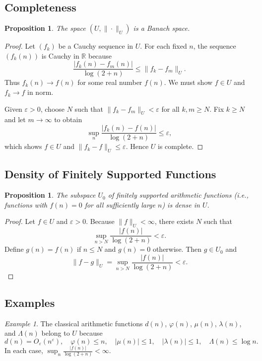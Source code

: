 \documentclass[11pt,a4paper]{article}
\theoremstyle{plain}
\newtheorem{proposition}[theorem]{Proposition}
\theoremstyle{definition}
\theoremstyle{remark}
\newtheorem{example}[theorem]{Example}
\begin{document}
\subsection{Completeness}
\begin{proposition}
	The space $(U,\|\cdot\|_{U})$ is a Banach space.
\end{proposition}

\begin{proof}
	Let $(f_k)$ be a Cauchy sequence in $U$.
	For each fixed $n$, the sequence $(f_k(n))$ is Cauchy in $\mathbb{R}$
	because
	\[
	\frac{|f_k(n)-f_m(n)|}{\log(2+n)} \le \|f_k-f_m\|_{U}.
	\]
	Thus $f_k(n)\to f(n)$ for some real number $f(n)$.
	We must show $f\in U$ and $f_k\to f$ in norm.
	
	Given $\varepsilon>0$, choose $N$ such that
	$\|f_k - f_m\|_{U} < \varepsilon$ for all $k,m\ge N$.
	Fix $k\ge N$ and let $m\to\infty$ to obtain
	\[
	\sup_{n}\frac{|f_k(n)-f(n)|}{\log(2+n)} \le \varepsilon,
	\]
	which shows $f\in U$ and $\|f_k - f\|_{U}\le \varepsilon$.
	Hence $U$ is complete.
\end{proof}

\subsection{Density of Finitely Supported Functions}
\begin{proposition}
	The subspace $U_0$ of finitely supported arithmetic functions
	(i.e., functions with $f(n)=0$ for all sufficiently large $n$)
	is dense in $U$.
\end{proposition}

\begin{proof}
	Let $f\in U$ and $\varepsilon>0$.
	Because $\|f\|_{U}<\infty$, there exists $N$ such that
	\[
	\sup_{n>N}\frac{|f(n)|}{\log(2+n)} < \varepsilon.
	\]
	Define $g(n) = f(n)$ if $n\le N$ and $g(n)=0$ otherwise.
	Then $g\in U_0$ and
	\[
	\|f-g\|_{U} = \sup_{n>N}\frac{|f(n)|}{\log(2+n)} < \varepsilon.
	\]
\end{proof}

\subsection{Examples}
\begin{example}
	The classical arithmetic functions
	$d(n)$, $\varphi(n)$, $\mu(n)$, $\lambda(n)$, and $\Lambda(n)$
	belong to $U$ because
	\[
	d(n) = O_\varepsilon(n^\varepsilon), \quad
	\varphi(n) \le n, \quad
	|\mu(n)| \le 1, \quad
	|\lambda(n)| \le 1, \quad
	\Lambda(n) \le \log n.
	\]
	In each case,
	$\displaystyle\sup_{n}\frac{|f(n)|}{\log(2+n)} < \infty$.
\end{example}
\end{document}
